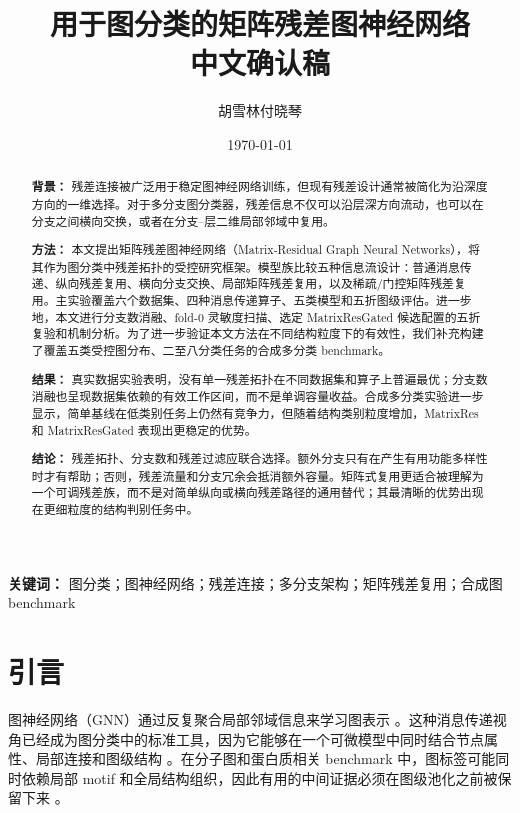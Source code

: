 \documentclass[UTF8,10pt]{ctexart}
\title{\textbf{用于图分类的矩阵残差图神经网络}\\{\large 中文确认稿}}
\author{胡雪林\quad 付晓琴}
\date{\today}
\let\cite\citep
\begin{document}
\maketitle

\begin{abstract}
\textbf{背景：} 残差连接被广泛用于稳定图神经网络训练，但现有残差设计通常被简化为沿深度方向的一维选择。对于多分支图分类器，残差信息不仅可以沿层深方向流动，也可以在分支之间横向交换，或者在分支--层二维局部邻域中复用。

\textbf{方法：} 本文提出矩阵残差图神经网络（Matrix-Residual Graph Neural Networks），将其作为图分类中残差拓扑的受控研究框架。模型族比较五种信息流设计：普通消息传递、纵向残差复用、横向分支交换、局部矩阵残差复用，以及稀疏/门控矩阵残差复用。主实验覆盖六个数据集、四种消息传递算子、五类模型和五折图级评估。进一步地，本文进行分支数消融、fold-0 灵敏度扫描、选定 MatrixResGated 候选配置的五折复验和机制分析。为了进一步验证本文方法在不同结构粒度下的有效性，我们补充构建了覆盖五类受控图分布、二至八分类任务的合成多分类 benchmark。

\textbf{结果：} 真实数据实验表明，没有单一残差拓扑在不同数据集和算子上普遍最优；分支数消融也呈现数据集依赖的有效工作区间，而不是单调容量收益。合成多分类实验进一步显示，简单基线在低类别任务上仍然有竞争力，但随着结构类别粒度增加，MatrixRes 和 MatrixResGated 表现出更稳定的优势。

\textbf{结论：} 残差拓扑、分支数和残差过滤应联合选择。额外分支只有在产生有用功能多样性时才有帮助；否则，残差流量和分支冗余会抵消额外容量。矩阵式复用更适合被理解为一个可调残差族，而不是对简单纵向或横向残差路径的通用替代；其最清晰的优势出现在更细粒度的结构判别任务中。
\end{abstract}

\noindent\textbf{关键词：} 图分类；图神经网络；残差连接；多分支架构；矩阵残差复用；合成图 benchmark
\par\medskip

\section{引言}

图神经网络（GNN）通过反复聚合局部邻域信息来学习图表示 \cite{gori2005new,kipf2017gcn}。这种消息传递视角已经成为图分类中的标准工具，因为它能够在一个可微模型中同时结合节点属性、局部连接和图级结构 \cite{gilmer2017neural,wu2020comprehensive}。在分子图和蛋白质相关 benchmark 中，图标签可能同时依赖局部 motif 和全局结构组织，因此有用的中间证据必须在图级池化之前被保留下来 \cite{duvenaud2015convolutional,ying2018hierarchical}。
\end{document}
